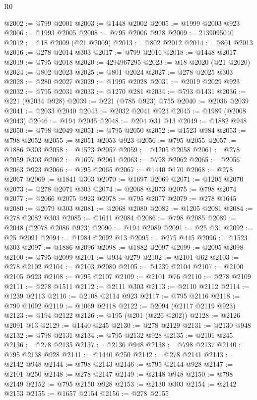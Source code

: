 \begin{lexlean}{R0}
\begin{coremodule}
@2002 := @799 @2001
@2003 := @1448 @2002
@2005 := @1999 @2003 @923
@2006 := @1993 @2005
@2008 := @795 @2006 @928
@2009 := 2139095040
@2012 := @18 @2009 (@21 @2009)
@2013 := @802 @2012
@2014 := @801 @2013
@2016 := @278 @2014 @303
@2017 := @799 @2016
@2018 := @1448 @2017
@2019 := @795 @2018
@2020 := 4294967295
@2023 := @18 @2020 (@21 @2020)
@2024 := @802 @2023
@2025 := @801 @2024
@2027 := @278 @2025 @303
@2028 := @280 @2027
@2029 := @1995 @2028
@2031 := @2019 @2029 @923
@2032 := @795 @2031
@2033 := @1270 @281
@2034 := @793 @1431
@2036 := @221 (@2034 @928)
@2039 := @221 (@785 @923) @755
@2040 := @2036 @2039
@2041 := @2033 @2040
@2043 := @2032 @2041 @923
@2045 := @1989 (@2008 @2043)
@2046 := @194 @2045
@2048 := @204 @31 @13
@2049 := @1882 @948
@2050 := @798 @2049
@2051 := @795 @2050
@2052 := @1523 @984
@2053 := @798 @2052
@2055 := @2051 @2053 @923
@2056 := @795 @2055
@2057 := @1886 @303
@2058 := @1523 @2057
@2059 := @1205 @2058
@2061 := @278 @2059 @303
@2062 := @1697 @2061
@2063 := @798 @2062
@2065 := @2056 @2063 @923
@2066 := @795 @2065
@2067 := @1440 @170
@2068 := @278 @2067
@2069 := @1841 @303
@2070 := @1697 @2069
@2071 := @1205 @2070
@2073 := @278 @2071 @303
@2074 := @2068 @2073
@2075 := @798 @2074
@2077 := @2066 @2075 @923
@2078 := @795 @2077
@2079 := @278 @1645
@2080 := @2079 @303
@2081 := @2068 @2080
@2082 := @1205 @2081
@2084 := @278 @2082 @303
@2085 := @1611 @2084
@2086 := @798 @2085
@2089 := @2048 (@2078 @2086 @923)
@2090 := @194 @2089
@2091 := @25 @31
@2092 := @25 @2091
@2094 := @1984 @2092 @13
@2095 := @275 @445
@2096 := @1523 @303
@2097 := @1886 @2096
@2098 := @1882 @2097
@2099 := @2095 @2098
@2100 := @795 @2099
@2101 := @934 @279
@2102 := @2101 @62
@2103 := @278 @2102
@2104 := @2103 @2080
@2105 := @1239 @2104
@2107 := @2100 @2105 @923
@2108 := @795 @2107
@2109 := @2101 @76
@2110 := @278 @2109
@2111 := @278 @1511
@2112 := @2111 @303
@2113 := @2110 @2112
@2114 := @1239 @2113
@2116 := @2108 @2114 @923
@2117 := @795 @2116
@2118 := @799 @1092
@2119 := @1069 @2118
@2122 := @2094 (@2117 @2119 @923)
@2123 := @194 @2122
@2126 := @195 (@201 (@226 @202))
@2128 := @2126 @2091 @13
@2129 := @1440 @245
@2130 := @278 @2129
@2131 := @2130 @948
@2132 := @798 @2131
@2134 := @795 @2132 @928
@2135 := @2101 @245
@2136 := @278 @2135
@2137 := @2136 @948
@2138 := @798 @2137
@2140 := @795 @2138 @928
@2141 := @1440 @250
@2142 := @278 @2141
@2143 := @2142 @948
@2144 := @798 @2143
@2146 := @795 @2144 @928
@2147 := @2101 @250
@2148 := @278 @2147
@2149 := @2148 @948
@2150 := @798 @2149
@2152 := @795 @2150 @928
@2153 := @2130 @303
@2154 := @2142 @2153
@2155 := @1657 @2154
@2156 := @278 @2155

\end{coremodule}
\end{lexlean}
